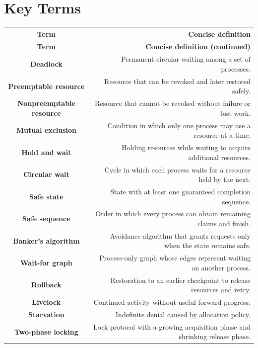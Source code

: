 \documentclass[10pt,letterpaper]{article}
\begin{document}
\section*{Key Terms}
\small
\begin{longtable}{C N}
\color{white}\textbf{Term} & \color{white}\textbf{Concise definition}\\
\endfirsthead
{}\color{white}\textbf{Term} & \color{white}\textbf{Concise definition (continued)}\\
\endhead
\textbf{Deadlock} & Permanent circular waiting among a set of processes.\\\hline
\textbf{Preemptable resource} & Resource that can be revoked and later restored safely.\\\hline
\textbf{Nonpreemptable resource} & Resource that cannot be revoked without failure or lost work.\\\hline
\textbf{Mutual exclusion} & Condition in which only one process may use a resource at a time.\\\hline
\textbf{Hold and wait} & Holding resources while waiting to acquire additional resources.\\\hline
\textbf{Circular wait} & Cycle in which each process waits for a resource held by the next.\\\hline
\textbf{Safe state} & State with at least one guaranteed completion sequence.\\\hline
\textbf{Safe sequence} & Order in which every process can obtain remaining claims and finish.\\\hline
\textbf{Banker's algorithm} & Avoidance algorithm that grants requests only when the state remains safe.\\\hline
\textbf{Wait-for graph} & Process-only graph whose edges represent waiting on another process.\\\hline
\textbf{Rollback} & Restoration to an earlier checkpoint to release resources and retry.\\\hline
\textbf{Livelock} & Continued activity without useful forward progress.\\\hline
\textbf{Starvation} & Indefinite denial caused by allocation policy.\\\hline
\textbf{Two-phase locking} & Lock protocol with a growing acquisition phase and shrinking release phase.\\\hline
\end{longtable}
\normalsize
\end{document}
